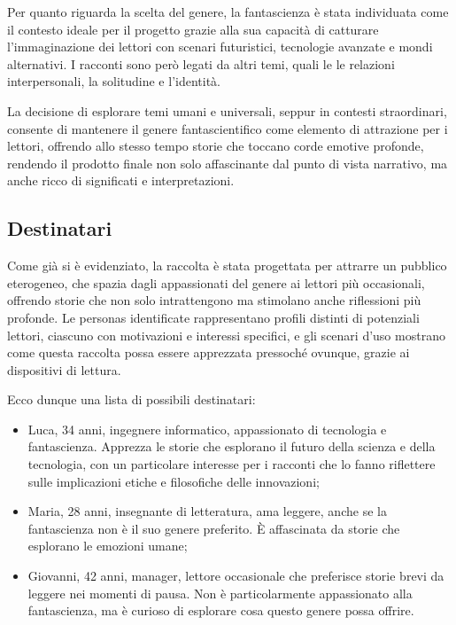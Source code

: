 \documentclass[a4paper,12pt]{article}
\begin{document}
\bigbreak

Per quanto riguarda la scelta del genere, la fantascienza è stata individuata come il contesto ideale per il progetto grazie alla sua capacità di catturare l'immaginazione dei lettori con scenari futuristici, tecnologie avanzate e mondi alternativi. I racconti sono però legati da altri temi, quali le le relazioni interpersonali, la solitudine e l'identità.

\bigbreak

La decisione di esplorare temi umani e universali, seppur in contesti straordinari, consente di mantenere il genere fantascientifico come elemento di attrazione per i lettori, offrendo allo stesso tempo storie che toccano corde emotive profonde, rendendo il prodotto finale non solo affascinante dal punto di vista narrativo, ma anche ricco di significati e interpretazioni.


\subsection*{Destinatari}


Come già si è evidenziato, la raccolta è stata progettata per attrarre un pubblico eterogeneo, che spazia dagli appassionati del genere ai lettori più occasionali, offrendo storie che non solo intrattengono ma stimolano anche riflessioni più profonde. Le personas identificate rappresentano profili distinti di potenziali lettori, ciascuno con motivazioni e interessi specifici, e gli scenari d'uso mostrano come questa raccolta possa essere apprezzata pressoché ovunque, grazie ai dispositivi di lettura.

Ecco dunque una lista di possibili destinatari:

\begin{itemize}
    \item Luca, 34 anni, ingegnere informatico, appassionato di tecnologia e fantascienza. Apprezza le storie che esplorano il futuro della scienza e della tecnologia, con un particolare interesse per i racconti che lo fanno riflettere sulle implicazioni etiche e filosofiche delle innovazioni;
    \item Maria, 28 anni, insegnante di letteratura, ama leggere, anche se la fantascienza non è il suo genere preferito. È affascinata da storie che esplorano le emozioni umane;
    \item Giovanni, 42 anni, manager, lettore occasionale che preferisce storie brevi da leggere nei momenti di pausa. Non è particolarmente appassionato alla fantascienza, ma è curioso di esplorare cosa questo genere possa offrire.
\end{itemize}
\end{document}
